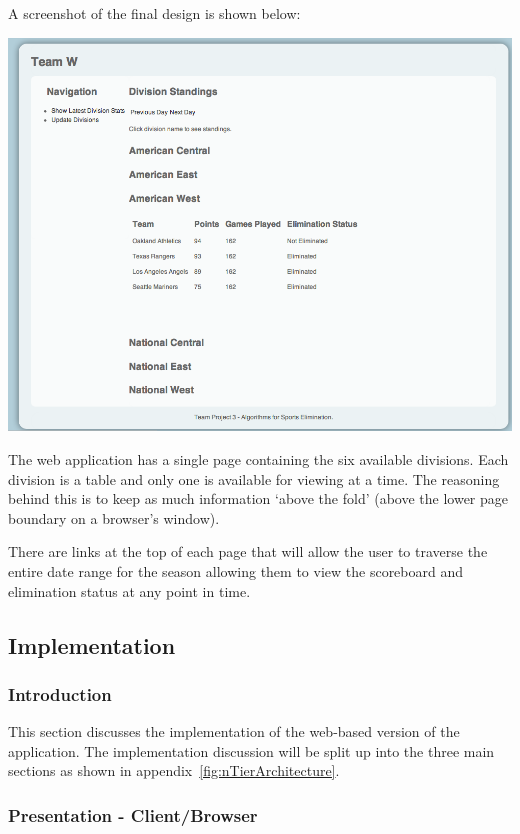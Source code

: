 A screenshot of the final design is shown below:

\includegraphics[width=\linewidth,keepaspectratio]
{images/webAppScreenshot.png}

The web application has a single page containing the six available divisions.
Each division is a table and only one is available for viewing at a time. The 
reasoning behind this is to keep as much information `above the fold' (above the
lower page boundary on a browser's window).

There are links at the top of each page that will allow the user to traverse
the entire date range for the season allowing them to view the scoreboard and
elimination status at any point in time.

\subsection{Implementation}

\subsubsection{Introduction}

This section discusses the implementation of the web-based version of the
application. The implementation discussion will be split up into the three
main sections as shown in appendix~\ref{fig:nTierArchitecture}.

\subsubsection{Presentation - Client/Browser}

